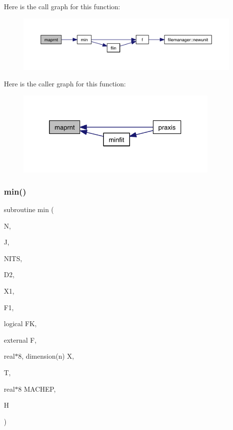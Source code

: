 Here is the call graph for this function\+:\nopagebreak
\begin{figure}[H]
\begin{center}
\leavevmode
\includegraphics[width=350pt]{praxis_8f_ac6663bade5f6b02f5bc8c05767d38027_cgraph}
\end{center}
\end{figure}
Here is the caller graph for this function\+:\nopagebreak
\begin{figure}[H]
\begin{center}
\leavevmode
\includegraphics[width=284pt]{praxis_8f_ac6663bade5f6b02f5bc8c05767d38027_icgraph}
\end{center}
\end{figure}
\mbox{\label{praxis_8f_ad17dd523e058957564e309fed67cfa20}} 
\subsubsection{\texorpdfstring{min()}{min()}}
{\footnotesize\ttfamily subroutine min (\begin{DoxyParamCaption}\item[{}]{N,  }\item[{}]{J,  }\item[{}]{N\+I\+TS,  }\item[{}]{D2,  }\item[{}]{X1,  }\item[{}]{F1,  }\item[{logical}]{FK,  }\item[{external}]{F,  }\item[{real$\ast$8, dimension(n)}]{X,  }\item[{}]{T,  }\item[{real$\ast$8}]{M\+A\+C\+H\+EP,  }\item[{}]{H }\end{DoxyParamCaption})}

